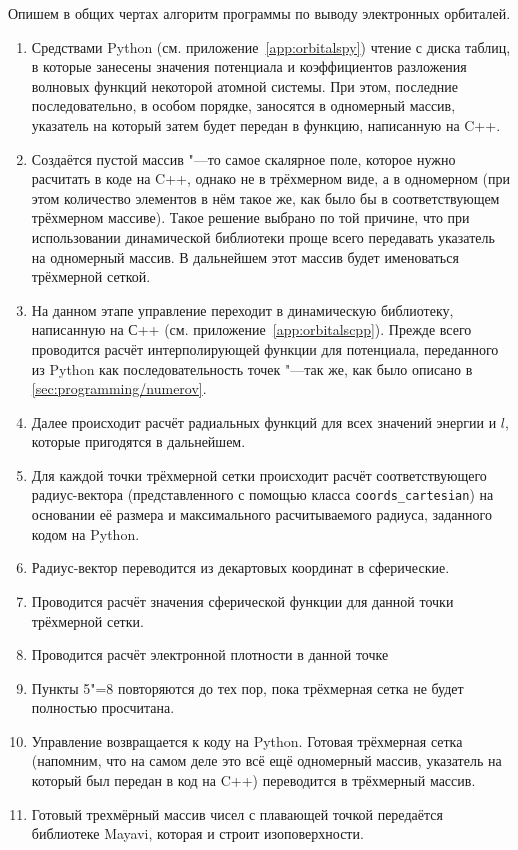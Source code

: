Опишем в общих чертах алгоритм программы по выводу электронных орбиталей.
\begin{enumerate}
  \item Средствами Python (см. приложение~\cref{app:orbitalspy}) чтение с диска таблиц, в которые занесены значения
  потенциала и коэффициентов разложения волновых функций некоторой атомной системы. При этом, последние последовательно,
  в особом порядке, заносятся в одномерный массив, указатель на который затем будет передан в функцию, написанную на C++.
  \item Создаётся пустой массив "---то самое скалярное поле, которое нужно расчитать в коде на C++, однако не в
  трёхмерном виде, а в одномерном (при этом количество элементов в нём такое же, как было бы в соответствующем
  трёхмерном массиве). Такое решение выбрано по той причине, что при использовании динамической библиотеки проще всего
  передавать указатель на одномерный массив. В дальнейшем этот массив будет именоваться трёхмерной сеткой.
  \item На данном этапе управление переходит в динамическую библиотеку, написанную на С++
  (см. приложение~\cref{app:orbitalscpp}). Прежде всего проводится расчёт интерполирующей функции для потенциала,
  переданного из Python как последовательность точек "---так же, как было описано в \cref{sec:programming/numerov}.
  \item Далее происходит расчёт радиальных функций для всех значений энергии и $l$, которые пригодятся в дальнейшем.
  \item Для каждой точки трёхмерной сетки происходит расчёт соответствующего радиус-вектора (представленного с помощью
  класса \texttt{coords\_cartesian}) на основании её размера и максимального расчитываемого радиуса, заданного кодом
  на Python.
  \item Радиус-вектор переводится из декартовых координат в сферические.
  \item Проводится расчёт значения сферической функции для данной точки трёхмерной сетки.
  \item Проводится расчёт электронной плотности в данной точке
  \item Пункты 5"=8 повторяются до тех пор, пока трёхмерная сетка не будет полностью просчитана.
  \item Управление возвращается к коду на Python. Готовая трёхмерная сетка (напомним, что на самом деле это всё ещё
  одномерный массив, указатель на который был передан в код на C++) переводится\cite{numpy-reshape} в трёхмерный массив.
  \item Готовый трехмёрный массив чисел с плавающей точкой передаётся библиотеке Mayavi, которая и строит изоповерхности.
\end{enumerate}

